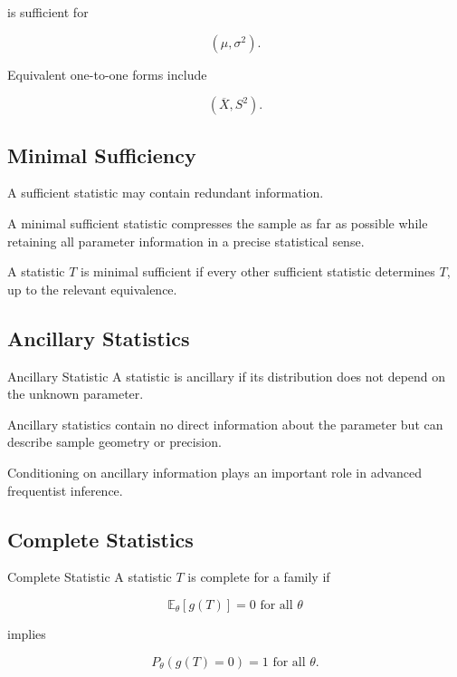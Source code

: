 is sufficient for

\[
(\mu,\sigma^2).
\]

Equivalent one-to-one forms include

\[
\boxed{
(
\overline{X},
S^2
).
}
\]

\subsection{Minimal Sufficiency}
\label{subsec:minimal-sufficiency}

A sufficient statistic may contain redundant information.

A minimal sufficient statistic compresses the sample as far as possible
while retaining all parameter information in a precise statistical
sense.

A statistic \(T\) is minimal sufficient if every other sufficient
statistic determines \(T\), up to the relevant equivalence.

\subsection{Ancillary Statistics}
\label{subsec:ancillary-statistics}

\begin{definitionbox}{Ancillary Statistic}
A statistic is ancillary if its distribution does not depend on the
unknown parameter.
\end{definitionbox}

Ancillary statistics contain no direct information about the parameter
but can describe sample geometry or precision.

Conditioning on ancillary information plays an important role in advanced
frequentist inference.

\subsection{Complete Statistics}
\label{subsec:complete-statistics}

\begin{definitionbox}{Complete Statistic}
A statistic \(T\) is complete for a family if

\[
\boxed{
\mathbb{E}_\theta[g(T)]=0
\text{ for all }\theta
}
\]

implies

\[
\boxed{
P_\theta(g(T)=0)=1
\text{ for all }\theta.
}
\]
\end{definitionbox}

